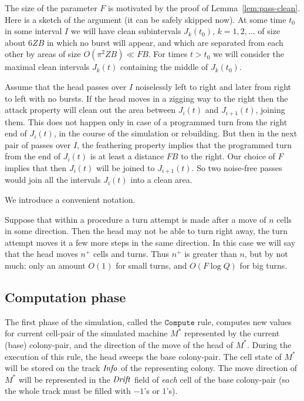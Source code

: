 \documentclass[11pt]{memoir}
\theoremstyle{definition} %
\newcommand{\fld}[1]{\ensuremath{\textit{#1\/}}}
\newcommand{\rul}[1]{\ensuremath{\texttt{#1}}}
\def\B{B}
\newcommand{\F}{F}
\newcommand{\passno}{\pi}
\newcommand{\Q}{Q}
\newcommand{\Z}{Z}
\newcommand{\Drift}{\fld{Drift}}
\newcommand{\Info}{\fld{Info}}
\newcommand{\Comp}{\rul{Compute}}
\begin{document}
\begin{sloppypar}
\begin{remark}\label{rem:big-turns}
  The size of the parameter \( \F \) is motivated by the proof of Lemma~\ref{lem:pass-clean}.
  Here is a sketch of the argument (it can be safely skipped now).
   At some time \( t_{0} \) in some interval \( I \)
  we will have clean subintervals \( J_{k}(t_{0}) \), \( k=1,2,\dots \)
  of size about \( 6\Z\B \) in which no burst will appear, and which are separated from each other by areas of
  size \( O(\passno^{2}\Z\B)\ll\F\B \).
  For times \( t>t_{0} \) we will consider the maximal clean intervals \( J_{k}(t) \) containing
  the middle of \( J_{k}(t_{0}) \).

  Assume that the head passes over \( I \) noiselessly left to right and later from right to left
  with no bursts.
  If the head moves in a zigging way to the
  right then the attack property will clean out the area between \( J_{i}(t) \) and \( J_{i+1}(t) \),
  joining them.
  This does not happen only in case of a programmed turn
  from the right end of \( J_{i}(t) \), in the course of the simulation or rebuilding.
  But then in the next pair of passes over \( I \), the feathering property implies that
  the programmed turn from the end of \( J_{i}(t) \) is at least a distance \( \F\B \) to the right.
  Our choice of \( \F \) implies that then \( J_{i}(t) \) will be joined to \( J_{i+1}(t) \).
  So two noise-free passes would join all the intervals \( J_{i}(t) \) into a clean area.  
\end{remark}  
\end{sloppypar}

We introduce a convenient notation.
\begin{notation}\label{not:plus}
Suppose that within a procedure a turn attempt is made after a move of \( n \) cells in some direction.
Then the head may not be able to turn right away, the turn attempt moves it a few more steps in the same
direction.
In this case we will say that the head moves \( n^{+} \) cells and turns.
Thus \( n^{+} \) is greater than \( n \), but by not much: only an amount \( O(1) \)
for small turns, and \( O(\F\log \Q) \) for big turns.
\end{notation}

\subsection{Computation phase}\label{sec:computation-phase}

The first phase of the simulation, called the \( \Comp \) rule,
computes new values for current cell-pair of the
simulated machine \( M^{*} \) represented by the current (base) colony-pair,
and the direction of the move of the head of  \( M^{*} \).
During the execution of this rule, the head sweeps the base colony-pair.  
The cell state of \( M^{*} \) will be stored on the track \( \Info \) of the
representing colony.
The move direction of \( M^{*} \) 
will be represented in the \( \Drift \) field of \emph{each} cell of the base colony-pair
(so the whole track must be filled with \( -1 \)'s or \( 1 \)'s).
\end{document}
